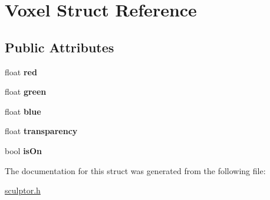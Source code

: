 \hypertarget{structVoxel}{}\section{Voxel Struct Reference}
\label{structVoxel}
\subsection*{Public Attributes}
\begin{DoxyCompactItemize}
\item 
\mbox{\label{structVoxel_af8715c373730c8f0bfe5df46dc376708}} 
float {\bfseries red}
\item 
\mbox{\label{structVoxel_aac0e7870d454df5817b5516bb293a33e}} 
float {\bfseries green}
\item 
\mbox{\label{structVoxel_a78da493d12803794ee78ae077720c14d}} 
float {\bfseries blue}
\item 
\mbox{\label{structVoxel_a2c892d1f8ba3b2dc1e5bb463c783d5ed}} 
float {\bfseries transparency}
\item 
\mbox{\label{structVoxel_a6fbe8bd53f64685ac4210726d40fc775}} 
bool {\bfseries is\+On}
\end{DoxyCompactItemize}


The documentation for this struct was generated from the following file\+:\begin{DoxyCompactItemize}
\item 
\mbox{\hyperlink{sculptor_8h}{sculptor.\+h}}\end{DoxyCompactItemize}
